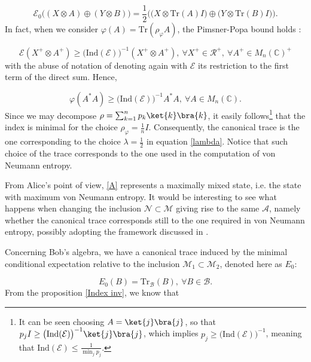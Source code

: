 \documentclass[a4paper,11pt]{article}
\begin{document}
\begin{equation}
    \mathcal{E}_0 \big( (X \otimes A) \oplus (Y \otimes B) \big) = \frac{1}{2} \Big( \big( X \otimes \mathrm{Tr}(A) I) \oplus \big( Y \otimes \mathrm{Tr}(B) I \big) \Big) \text{.}
\end{equation}
%
In fact, when we consider $\varphi(A) = \mathrm{Tr}(\rho_{\varphi}A)$, the Pimsner-Popa bound holds \cite{Pimsner-Popa}:

\begin{equation}
    \mathcal{E} (X^+ \otimes A^+) \geq \big( \mathrm{Ind}(\mathcal{E}) \big)^{-1} (X^+ \otimes A^+), \ \forall X^+ \in \mathcal{R}^+, \ \forall A^+ \in M_n(\mathbb{C})^+
\end{equation}
%
with the abuse of notation of denoting again with $\mathcal{E}$ its restriction to the first term of the direct sum. Hence,

\begin{equation}
    \varphi(A^* A) \geq \big( \mathrm{Ind}(\mathcal{E}) \big)^{-1} A^* A, \ \forall A \in M_n(\mathbb{C}) \text{.}
\end{equation}
%
Since we may decompose $\rho = \sum_{k = 1}^n p_k \ket{k} \bra{k}$, it easily follows\footnote{It can be seen choosing $A = \ket{j} \bra{j}$, so that $p_j I \geq \big( \mathrm{Ind}(\mathcal{E}) \big)^{-1} \ket{j} \bra{j}$, which implies $p_j \geq \big( \mathrm{Ind}(\mathcal{E}) \big)^{-1}$, meaning that $\mathrm{Ind}(\mathcal{E}) \leq \frac{1}{\min_{j}{p_j}}$.} that the index is minimal for the choice $\rho_{\varphi} = \frac{1}{n} I$. Consequently, the canonical trace is the one corresponding to the choice $\lambda = \frac{1}{2}$ in equation \ref{lambda}. Notice that such choice of the trace corresponds to the one used in the computation of von Neumann entropy.

From Alice's point of view, \ref{A} represents a maximally mixed state, i.e. the state with maximum von Neumann entropy. It would be interesting to see what happens when changing the inclusion $\mathcal{N} \subset \mathcal{M}$ giving rise to the same $\mathcal{A}$, namely whether the canonical trace corresponds still to the one required in von Neumann entropy, possibly adopting the framework discussed in \cite{Balachandran}.

Concerning Bob's algebra, we have a canonical trace induced by the minimal conditional expectation relative to the inclusion $\mathcal{M}_1 \subset \mathcal{M}_2$, denoted here as $E_0$:

\begin{equation}
    E_0(B) = \mathrm{Tr}_{\mathcal{B}}(B), \ \forall B \in \mathcal{B} \text{.}
\end{equation}
%
From the proposition \ref{Index inv}, we know that
\end{document}
